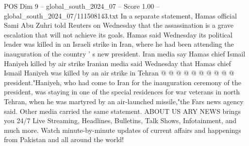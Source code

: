 \begin{textsample}{POS Dim 9 – global\_south\_2024\_07 – Score 1.00 – global\_south\_2024\_07/111508143.txt}
In a separate statement, Hamas official Sami Abu Zuhri told Reuters on Wednesday that the assassination is a grave escalation that will not achieve its goals.
Hamas said Wednesday its political leader was killed in an Israeli strike in Iran, where he had been attending the inauguration of the country ' s new president.
Iran media say Hamas chief Ismail Haniyeh killed by air strike Iranian media said Wednesday that Hamas chief Ismail Haniyeh was killed by an air strike in Tehran @ @ @ @ @ @ @ @ @ @ president."Haniyeh, who had come to Iran for the inauguration ceremony of the president, was staying in one of the special residences for war veterans in north Tehran, when he was martyred by an air-launched missile,"the Fars news agency said.
Other media carried the same statement.
ABOUT US ARY NEWS brings you 24/7 Live Streaming, Headlines, Bulletins, Talk Shows, Infotainment, and much more.
Watch minute-by-minute updates of current affairs and happenings from Pakistan and all around the world!

\end{textsample}
